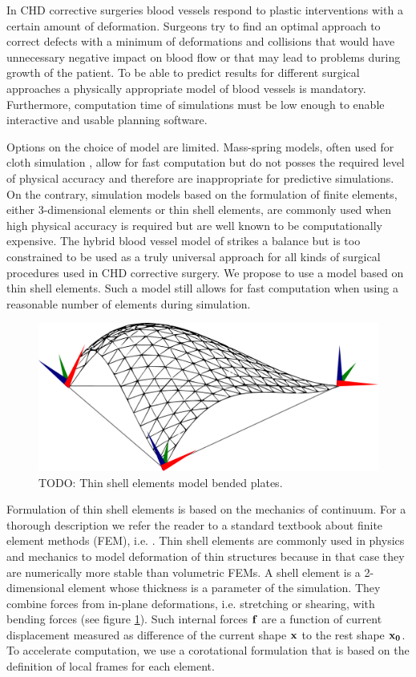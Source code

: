 In CHD corrective surgeries blood vessels respond to plastic interventions with a certain amount of deformation. Surgeons try to find an optimal approach to correct defects with a minimum of deformations and collisions that would have unnecessary negative impact on blood flow or that may lead to problems during growth of the patient. To be able to predict results for different surgical approaches a physically appropriate model of blood vessels is mandatory. Furthermore, computation time of simulations must be low enough to enable interactive and usable planning software.

Options on the choice of model are limited. Mass-spring models, often used for cloth simulation \cite{Volino2005b}, allow for fast computation but do not posses the required level of physical accuracy and therefore are inappropriate for predictive simulations. On the contrary, simulation models based on the formulation of finite elements, either 3-dimensional elements or thin shell elements, are commonly used when high physical accuracy is required but are well known to be computationally expensive. The hybrid blood vessel model of \cite{Li2009} strikes a balance but is too constrained to be used as a truly universal approach for all kinds of surgical procedures used in CHD corrective surgery. We propose to use a model based on thin shell elements. Such a model still allows for fast computation when using a reasonable number of elements during simulation.

\begin{figure}[tbh]
  \centering
  \includegraphics[width=0.4\columnwidth]{img/shell.pdf}
  \caption{TODO: Thin shell elements model bended plates.}
  \label{fig-shell}
\end{figure}

Formulation of thin shell elements is based on the mechanics of continuum. For a thorough description we refer the reader to a standard textbook about finite element methods (FEM), i.e. \cite{Reddy1993}. Thin shell elements are commonly used in physics and mechanics to model deformation of thin structures because in that case they are numerically more stable than volumetric FEMs. A shell element is a 2-dimensional element whose thickness is a parameter of the simulation. They combine forces from in-plane deformations, i.e. stretching or shearing, with bending forces (see figure \ref{fig-shell}). Such internal forces $\mathbf{f}$ are a function of current displacement measured as difference of the current shape $\mathbf{x}$ to the rest shape $\mathbf{x_0}$. To accelerate computation, we use a corotational formulation that is based on the definition of local frames for each element.

